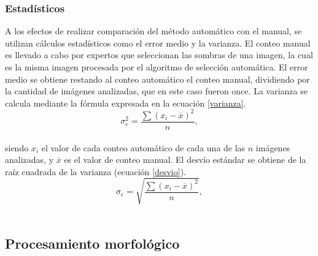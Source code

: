 \subsubsection{Estadísticos} 
A los efectos de realizar comparación del método automático con el manual, se utilizan cálculos estadísticos como el error medio y la varianza. El conteo manual es llevado a cabo por expertos que seleccionan las sombras de una imagen, la cual es la misma imagen procesada por el algoritmo de selección automática. El error medio se obtiene restando al conteo automático el conteo manual, dividiendo por la cantidad de imágenes analizadas, que en este caso fueron once.
La varianza se calcula mediante la fórmula expresada en la ecuación \ref{varianza}.
\\
\begin{equation}
	\sigma_{e} ^2=\frac{\sum (x_{i}-\overline{x})^2}{n},\label{varianza}
\end{equation}
\\
siendo $x_i$ el valor de cada conteo automático de cada una de las $n$ imágenes analizadas, y $\overline{x}$ es el valor de conteo manual.
El desvío estándar se obtiene de la raíz cuadrada de la varianza (ecuación \ref{desvio}).
\\
\begin{equation}
	\sigma_{e}=\sqrt{\frac{\sum (x_{i}-\overline{x})^2}{n}},\label{desvio}
\end{equation}
\\
\subsection{Procesamiento morfológico} \label{metodo morfo}%

